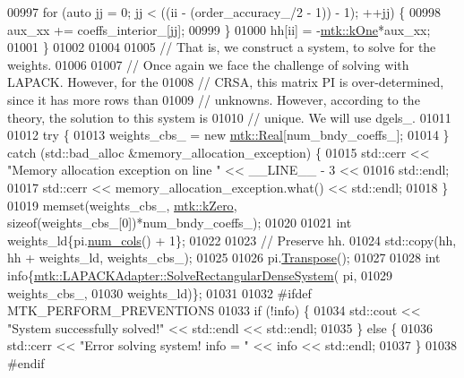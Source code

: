 \begin{DoxyCode}
{{00997     \textcolor{keywordflow}{for} (\textcolor{keyword}{auto} jj = 0; jj < ((ii - (order\_accuracy\_/2 - 1)) - 1); ++jj) \{
00998       aux\_xx += coeffs\_interior\_[jj];
00999     \}
01000     hh[ii] = -\hyperlink{group__c01-roots_ga26407c24d43b6b95480943340d285c71}{mtk::kOne}*aux\_xx;
01001   \}
01002 
01004 
01005   \textcolor{comment}{// That is, we construct a system, to solve for the weights.}
01006 
01007   \textcolor{comment}{// Once again we face the challenge of solving with LAPACK. However, for the}
01008   \textcolor{comment}{// CRSA, this matrix PI is over-determined, since it has more rows than}
01009   \textcolor{comment}{// unknowns. However, according to the theory, the solution to this system is}
01010   \textcolor{comment}{// unique. We will use dgels\_.}
01011 
01012   \textcolor{keywordflow}{try} \{
01013     weights\_cbs\_ = \textcolor{keyword}{new} \hyperlink{group__c01-roots_gac080bbbf5cbb5502c9f00405f894857d}{mtk::Real}[num\_bndy\_coeffs\_];
01014   \} \textcolor{keywordflow}{catch} (std::bad\_alloc &memory\_allocation\_exception) \{
01015     std::cerr << \textcolor{stringliteral}{"Memory allocation exception on line "} << \_\_LINE\_\_ - 3 <<
01016       std::endl;
01017     std::cerr << memory\_allocation\_exception.what() << std::endl;
01018   \}
01019   memset(weights\_cbs\_, \hyperlink{group__c01-roots_ga59a451a5fae30d59649bcda274fea271}{mtk::kZero}, \textcolor{keyword}{sizeof}(weights\_cbs\_[0])*num\_bndy\_coeffs\_);
01020 
01021   \textcolor{keywordtype}{int} weights\_ld\{pi.\hyperlink{classmtk_1_1DenseMatrix_a41747502d468c6728a4be31501b16e0e}{num\_cols}() + 1\};
01022 
01023   \textcolor{comment}{// Preserve hh.}
01024   std::copy(hh, hh + weights\_ld, weights\_cbs\_);
01025 
01026   pi.\hyperlink{classmtk_1_1DenseMatrix_a71d9c07ca66e88d97d1fd5012f43138b}{Transpose}();
01027 
01028   \textcolor{keywordtype}{int} info\{\hyperlink{classmtk_1_1LAPACKAdapter_a380f148ffdf96bae2f79ae28f1a6560c}{mtk::LAPACKAdapter::SolveRectangularDenseSystem}(
      pi,
01029                                                            weights\_cbs\_,
01030                                                            weights\_ld)\};
01031 
01032 \textcolor{preprocessor}{  #ifdef MTK\_PERFORM\_PREVENTIONS}
01033   \textcolor{keywordflow}{if} (!info) \{
01034     std::cout << \textcolor{stringliteral}{"System successfully solved!"} << std::endl << std::endl;
01035   \} \textcolor{keywordflow}{else} \{
01036     std::cerr << \textcolor{stringliteral}{"Error solving system! info = "} << info << std::endl;
01037   \}
01038 \textcolor{preprocessor}{  #endif}
}}
\end{DoxyCode}

